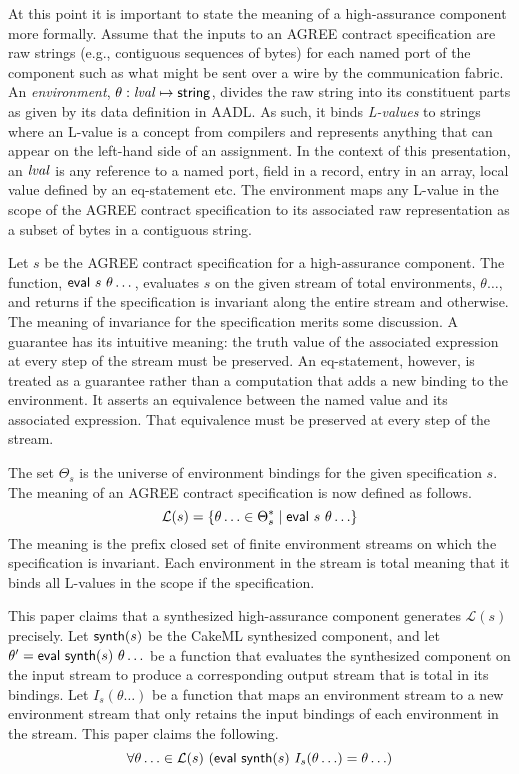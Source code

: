 At this point it is important to state the meaning of a high-assurance component more formally. Assume that the inputs to an AGREE contract specification are raw strings (e.g., contiguous sequences of bytes) for each named port of the component such as what might be sent over a wire by the communication fabric. An \emph{environment}, $\theta: \mathit{lval} \mapsto \mathsf{string}$, divides the raw string into its constituent parts as given by its data definition in AADL. As such, it binds \emph{L-values} to strings where an L-value is a concept from compilers and represents anything that can appear on the left-hand side of an assignment. In the context of this presentation, an $\mathit{lval}$ is any reference to a named port, field in a record, entry in an array, local value defined by an eq-statement etc. The environment maps any L-value in the scope of the AGREE contract specification to its associated raw representation as a subset of bytes in a contiguous string.

Let $s$ be the AGREE contract specification for a high-assurance component. The function, $\konst{eval}\ s\ \theta\dots$, evaluates $s$ on the given stream of total environments, $\theta\dots$, and returns  if the specification is invariant along the entire stream and  otherwise. The meaning of invariance for the specification merits some discussion. A guarantee has its intuitive meaning: the truth value of the associated expression at every step of the stream must be preserved. An eq-statement, however, is treated as a guarantee rather than a computation that adds a new binding to the environment. It asserts an equivalence between the named value and its associated expression. That equivalence must be preserved at every step of the stream.

The set $\Theta_s$ is the universe of environment bindings for the given specification $s$. 
The meaning of an AGREE contract specification is now defined as follows.
%
\[
  \mathcal{L}(s) = \{\theta\ldots \in \Theta_s^* \mid \mathsf{eval}\ s\ \theta\ldots\}  
\]
%
The meaning is the prefix closed set of finite environment streams on which the specification is invariant. Each environment in the stream is total meaning that it binds all L-values in the scope if the specification.

This paper claims that a synthesized high-assurance component generates $\mathcal{L}(s)$ precisely. Let $\mathsf{synth}(s)$ be the CakeML synthesized component, and let $\theta^\prime = \konst{eval}\ \konst{synth}(s)\ \theta\ldots$ be a function that evaluates the synthesized component on the input stream to produce a corresponding output stream that is total in its bindings. Let $I_s(\theta\ldots)$ be a function that maps an environment stream to a new environment stream that only retains the input bindings of each environment in the stream. This paper claims the following.
%
\[
  \forall \theta\ldots \in \mathcal{L}(s)\ (\konst{eval}\ \konst{synth}(s)\ I_s(\theta\ldots) = \theta\ldots) \\
\]
%
